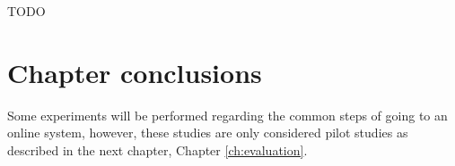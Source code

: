 TODO

\section{Chapter conclusions}
\label{sec:online_bci_system_other_changes_conclusion}

Some experiments will be performed regarding the common steps of going to an online system, however, these studies are only considered pilot studies as described in the next chapter, Chapter \ref{ch:evaluation}.
